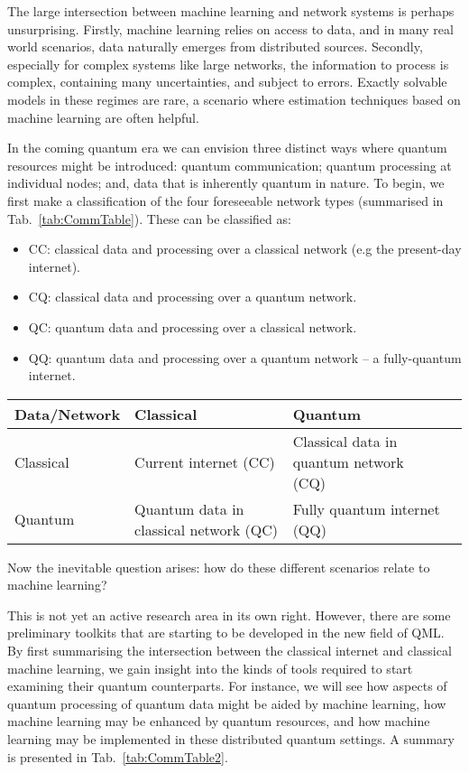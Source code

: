 The large intersection between machine learning and network systems is perhaps unsurprising. Firstly, machine learning relies on access to data, and in many real world scenarios, data naturally emerges from distributed sources. Secondly, especially for complex systems like large networks, the information to process is complex, containing many uncertainties, and subject to errors. Exactly solvable models in these regimes are rare, a scenario where estimation techniques based on machine learning are often helpful.

In the coming quantum era we can envision three distinct ways where quantum resources might be introduced: quantum communication; quantum processing at individual nodes; and, data that is inherently quantum in nature. To begin, we first make a classification of the four foreseeable network types (summarised in Tab.~\ref{tab:CommTable}). These can be classified as:

\begin{itemize}
\item CC: classical data and processing over a classical network (e.g the present-day internet).
\item CQ: classical data and processing over a quantum network.
\item QC: quantum data and processing over a classical network.
\item QQ: quantum data and processing over a quantum network -- a fully-quantum internet.
\end{itemize}

\startnormtable
\begin{table*}[htbp!]
\begin{tabular}{|l|l|l|l|}
\hline
Data/Network & Classical & Quantum \\
\hline
\hline
Classical & Current internet (CC) & Classical data in quantum network (CQ) \\
Quantum & Quantum data in classical network (QC) & Fully quantum internet (QQ)\\
\hline
\end{tabular}
\captionspacetab \caption{\label{tab:CommTable}Classical and quantum data in a network.}
\end{table*}

Now the inevitable question arises: how do these different scenarios relate to machine learning?

This is not yet an active research area in its own right. However, there are some preliminary toolkits that are starting to be developed in the new field of QML. By first summarising the intersection between the classical internet and classical machine learning, we gain insight into the kinds of tools required to start examining their quantum counterparts. For instance, we will see how aspects of quantum processing of quantum data might be aided by machine learning, how machine learning may be enhanced by quantum resources, and how machine learning may be implemented in these distributed quantum settings. A summary is presented in Tab.~\ref{tab:CommTable2}. 


